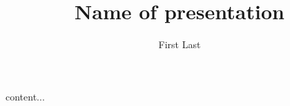 \documentclass[t]{beamer}
\title{Name of presentation}
\author{First Last}
\institute[RC]{Research Center \newline Department \newline University \newline \newline February 2018}
\date[\today]{}
\begin{document}
\begin{frame}
content...
\end{frame}
\end{document}
